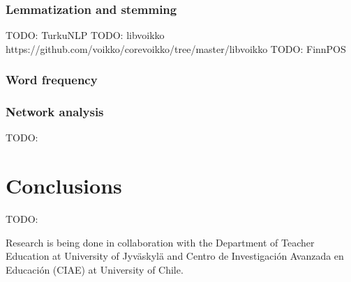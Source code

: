 \documentclass[utf8,english]{gradu3}
\begin{document}
\subsection{Lemmatization and stemming}
  TODO: TurkuNLP \parencite{kanerva2018turku}
  TODO: libvoikko https://github.com/voikko/corevoikko/tree/master/libvoikko
  TODO: FinnPOS \parencite{silfverberg2016finnpos}
\subsection{Word frequency}
\subsection{Network analysis}



TODO:
\chapter{Conclusions}
TODO:

Research is being done in collaboration with the Department of Teacher Education at University of Jyväskylä and Centro de Investigación Avanzada en Educación (CIAE) at University of Chile.
 
\printbibliography
\end{document}

